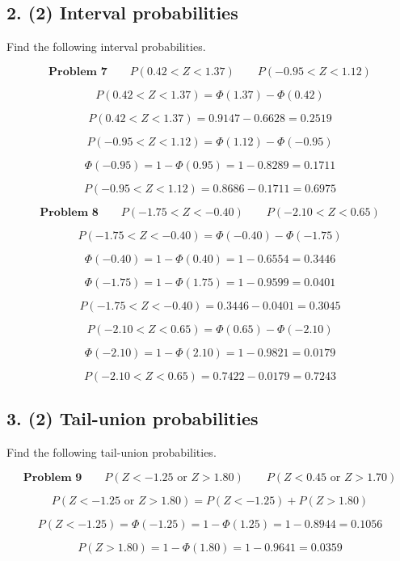 	
	\subsection*{2. (2) Interval probabilities}
	\label{subsec:standard-normal-table-problems-c5-2}
	Find the following interval probabilities.
	
	\[
	\textbf{Problem 7}
	\qquad
	P(0.42<Z<1.37)
	\qquad
	P(-0.95<Z<1.12)
	\]
	
	\[
	P(0.42<Z<1.37)=\Phi(1.37)-\Phi(0.42)
	\]
	
	\[
	P(0.42<Z<1.37)=0.9147-0.6628=0.2519
	\]
	
	\[
	P(-0.95<Z<1.12)=\Phi(1.12)-\Phi(-0.95)
	\]
	
	\[
	\Phi(-0.95)=1-\Phi(0.95)=1-0.8289=0.1711
	\]
	
	\[
	P(-0.95<Z<1.12)=0.8686-0.1711=0.6975
	\]
	
	\[
	\textbf{Problem 8}
	\qquad
	P(-1.75<Z<-0.40)
	\qquad
	P(-2.10<Z<0.65)
	\]
	
	\[
	P(-1.75<Z<-0.40)=\Phi(-0.40)-\Phi(-1.75)
	\]
	
	\[
	\Phi(-0.40)=1-\Phi(0.40)=1-0.6554=0.3446
	\]
	
	\[
	\Phi(-1.75)=1-\Phi(1.75)=1-0.9599=0.0401
	\]
	
	\[
	P(-1.75<Z<-0.40)=0.3446-0.0401=0.3045
	\]
	
	\[
	P(-2.10<Z<0.65)=\Phi(0.65)-\Phi(-2.10)
	\]
	
	\[
	\Phi(-2.10)=1-\Phi(2.10)=1-0.9821=0.0179
	\]
	
	\[
	P(-2.10<Z<0.65)=0.7422-0.0179=0.7243
	\]
	
	
	\subsection*{3. (2) Tail-union probabilities}
	\label{subsec:standard-normal-table-problems-c5-3}
	Find the following tail-union probabilities.
	
	\[
	\textbf{Problem 9}
	\qquad
	P(Z<-1.25\text{ or }Z>1.80)
	\qquad
	P(Z<0.45\text{ or }Z>1.70)
	\]
	
	\[
	P(Z<-1.25\text{ or }Z>1.80)=P(Z<-1.25)+P(Z>1.80)
	\]
	
	\[
	P(Z<-1.25)=\Phi(-1.25)=1-\Phi(1.25)=1-0.8944=0.1056
	\]
	
	\[
	P(Z>1.80)=1-\Phi(1.80)=1-0.9641=0.0359
	\]
	
